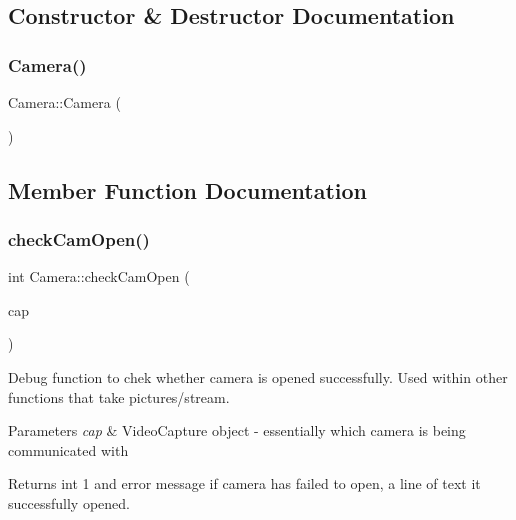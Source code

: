 \subsection{Constructor \& Destructor Documentation}
\mbox{\label{classCamera_a01f94c3543f56ede7af49dc778f19331}} 
\subsubsection{\texorpdfstring{Camera()}{Camera()}}
{\footnotesize\ttfamily Camera\+::\+Camera (\begin{DoxyParamCaption}{ }\end{DoxyParamCaption})\hspace{0.3cm}{\ttfamily [inline]}}



\subsection{Member Function Documentation}
\mbox{\label{classCamera_a230bee20d42ae409aba0700d8205bbe0}} 
\subsubsection{\texorpdfstring{check\+Cam\+Open()}{checkCamOpen()}}
{\footnotesize\ttfamily int Camera\+::check\+Cam\+Open (\begin{DoxyParamCaption}\item[{cv\+::\+Video\+Capture}]{cap }\end{DoxyParamCaption})}

Debug function to chek whether camera is opened successfully. Used within other functions that take pictures/stream.


\begin{DoxyParams}{Parameters}
{\em cap} & Video\+Capture object -\/ essentially which camera is being communicated with\\
\hline
\end{DoxyParams}
\begin{DoxyReturn}{Returns}
int 1 and error message if camera has failed to open, a line of text it successfully opened. 
\end{DoxyReturn}
\mbox{\label{classCamera_a5dd9bbe1eac3485d2fb835e21f0d9a9d}} 
